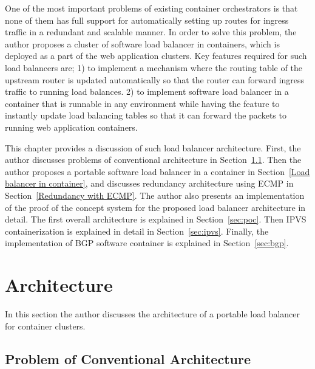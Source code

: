 
One of the most important problems of existing container orchestrators is that none of them has full support for automatically setting up routes for ingress traffic in a redundant and scalable manner.
In order to solve this problem, the author proposes a cluster of software load balancer in containers, which is deployed as a part of the web application clusters.
Key features required for such load balancers are;
1) to implement a mechanism where the routing table of the upstream router is updated automatically so that the router can forward ingress traffic to running load balances.
2) to implement software load balancer in a container that is runnable in any environment while having the feature to instantly update load balancing tables so that it can forward the packets to running web application containers.

This chapter provides a discussion of such load balancer architecture.
First, the author discusses problems of conventional architecture in Section~\ref{Problem of Conventional Architecture}.
Then the author proposes a portable software load balancer in a container in Section~\ref{Load balancer in container}, and discusses redundancy architecture using ECMP in Section~\ref{Redundancy with ECMP}.
%
The author also presents an implementation of the proof of the concept system for the proposed load balancer architecture in detail.
The first overall architecture is explained in Section~\ref{sec:poc}.
Then IPVS containerization is explained in detail in Section~\ref{sec:ipvs}.
Finally, the implementation of BGP software container is explained in Section~\ref{sec:bgp}.

\section{Architecture}

In this section the author discusses the architecture of a portable load balancer for container clusters.

\subsection{Problem of Conventional Architecture}\label{Problem of Conventional Architecture}

